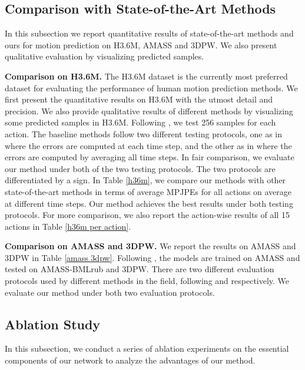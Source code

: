 \documentclass[10pt,twocolumn,letterpaper]{article}
\begin{document}
       





    
\subsection{Comparison with State-of-the-Art Methods}
In this subsection we report quantitative results of state-of-the-art methods and ours for motion prediction on H3.6M, AMASS and 3DPW. We also present qualitative evaluation by visualizing predicted samples.

\noindent
\textbf{Comparison on H3.6M. }
The H3.6M dataset is the currently most preferred dataset for evaluating the performance of human motion prediction methods. We first present the quantitative results on H3.6M with the utmost detail and precision. We also provide qualitative results of different methods by visualizing some predicted samples in H3.6M.
Following \cite{guo2023back}, we test 256 samples for each action. The baseline methods follow two different testing protocols, one as in \cite{mao2020history} where the errors are computed at each time step, and the other as in \cite{sofianos2021space} where the errors are computed by averaging all time steps.
In fair comparison, we evaluate our method under both of the two testing protocols. The two protocols are differentiated by a  sign.
In Table \ref{h36m}, we compare our methods with other state-of-the-art methods in terms of average MPJPEs for all actions on average at different time steps.
Our method achieves the best results under both testing protocols.
For more comparison, we also report the action-wise results of all 15 actions in Table \ref{h36m per action}.



\noindent
\textbf{Comparison on AMASS and 3DPW. }
We report the results on AMASS and 3DPW in Table \ref{amass 3dpw}. Following \cite{guo2023back}, the models are trained on AMASS and tested on AMASS-BMLrub and 3DPW. There are two different evaluation protocols used by different methods in the field, following \cite{sofianos2021space} and \cite{mao2019learning} respectively. We evaluate our method under both two evaluation protocols.











    

\subsection{Ablation Study}
In this subsection, we conduct a series of ablation experiments on the essential components of our network to analyze the advantages of our method.
\end{document}
